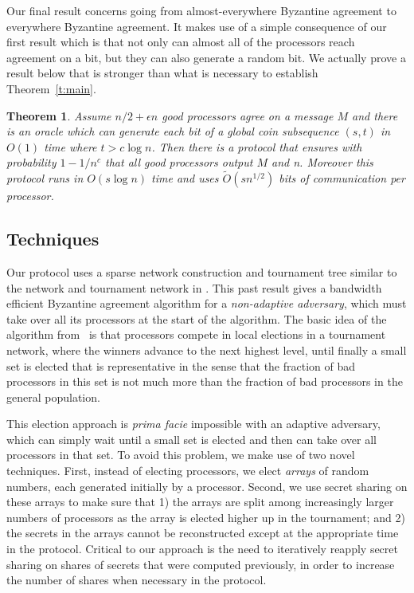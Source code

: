 \documentclass[letterpaper,11pt]{article}
\newtheorem{theorem}{Theorem}
\begin{document}
Our final result concerns going from almost-everywhere Byzantine agreement to everywhere Byzantine agreement.  It makes use of a simple consequence of our first result which is that not only can almost all of the processors reach agreement on a bit, but they can also generate a random bit.  We actually prove a result below that is stronger than what is necessary to establish Theorem~\ref{t:main}.

\begin{theorem}\label{t:ae2e}
Assume $n/2 + \epsilon n$ good processors agree on a message $M$ and there is an oracle which can generate each bit of a global coin subsequence $(s,t)$ in $O(1)$ time where $t > c\log n$. Then  there is a protocol that ensures with probability $1-1/n^c$  that all good processors output $M$ and n.  Moreover this protocol runs in $O(s \log n)$ time and uses $\tilde{O}( s n^{1/2})$ bits of communication per processor.
\end{theorem} 


\subsection{Techniques}

Our protocol uses a sparse network construction and tournament tree similar to the network and tournament network in \cite{KSSV}.  This past result gives a bandwidth efficient Byzantine agreement algorithm for a \emph{non-adaptive adversary},  which must take over all its processors at the start of the algorithm.  The basic idea of the algorithm from~\cite{KSSV} is that processors compete in local elections in a tournament network, where the winners advance to the next highest level, until finally a small set is elected that is representative in the sense that the fraction of bad processors in this set is not much more than the fraction of bad processors in the general population.

This election approach is \emph{prima facie} impossible with an adaptive adversary, which can simply wait until a small set is elected and then can take over all processors in that set.  To avoid this problem, we make use of two novel techniques.  First, instead of electing processors, we elect \emph{arrays} of random numbers, each generated initially by a processor.  Second, we use secret sharing on these arrays to make sure that 1) the arrays are split among increasingly larger numbers of processors as the array is elected higher up in the tournament; and 2) the secrets in the arrays cannot be reconstructed except at the appropriate time in the protocol.  Critical to our approach is the need to iteratively reapply secret sharing on shares of secrets that were computed previously, in order to increase the number of shares when necessary in the protocol.
\end{document}
